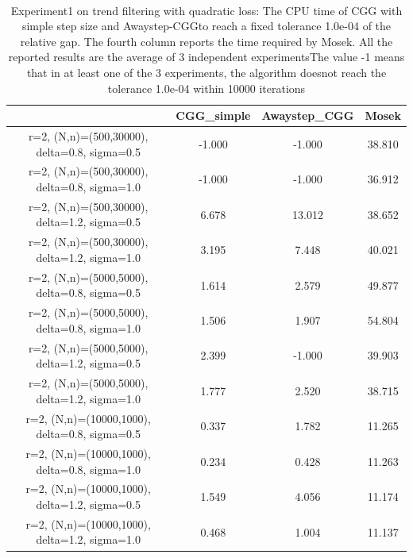 \documentclass[english]{article}
\begin{document}
\begin{table}[H]\
	\centering
	\label{Table_exp1}
	\begin{tabular}{cccc}
		\toprule
		{} &  CGG\_simple &  Awaystep\_CGG &  Mosek \\
		\midrule
		r=2, (N,n)=(500,30000), delta=0.8, sigma=0.5  &      -1.000 &        -1.000 & 38.810 \\
		r=2, (N,n)=(500,30000), delta=0.8, sigma=1.0  &      -1.000 &        -1.000 & 36.912 \\
		r=2, (N,n)=(500,30000), delta=1.2, sigma=0.5  &       6.678 &        13.012 & 38.652 \\
		r=2, (N,n)=(500,30000), delta=1.2, sigma=1.0  &       3.195 &         7.448 & 40.021 \\
		r=2, (N,n)=(5000,5000), delta=0.8, sigma=0.5  &       1.614 &         2.579 & 49.877 \\
		r=2, (N,n)=(5000,5000), delta=0.8, sigma=1.0  &       1.506 &         1.907 & 54.804 \\
		r=2, (N,n)=(5000,5000), delta=1.2, sigma=0.5  &       2.399 &        -1.000 & 39.903 \\
		r=2, (N,n)=(5000,5000), delta=1.2, sigma=1.0  &       1.777 &         2.520 & 38.715 \\
		r=2, (N,n)=(10000,1000), delta=0.8, sigma=0.5 &       0.337 &         1.782 & 11.265 \\
		r=2, (N,n)=(10000,1000), delta=0.8, sigma=1.0 &       0.234 &         0.428 & 11.263 \\
		r=2, (N,n)=(10000,1000), delta=1.2, sigma=0.5 &       1.549 &         4.056 & 11.174 \\
		r=2, (N,n)=(10000,1000), delta=1.2, sigma=1.0 &       0.468 &         1.004 & 11.137 \\
		\bottomrule
	\end{tabular}
	\caption{Experiment1 on trend filtering with quadratic loss: The CPU time of CGG with simple step size and Awaystep-CGGto reach a fixed tolerance 1.0e-04 of the relative gap. The fourth column reports the time required by Mosek. All the reported results are the average of 3 independent experimentsThe value -1 means that in at least one of the 3 experiments, the algorithm doesnot reach the tolerance 1.0e-04 within 10000 iterations}
\end{table}
\end{document}
